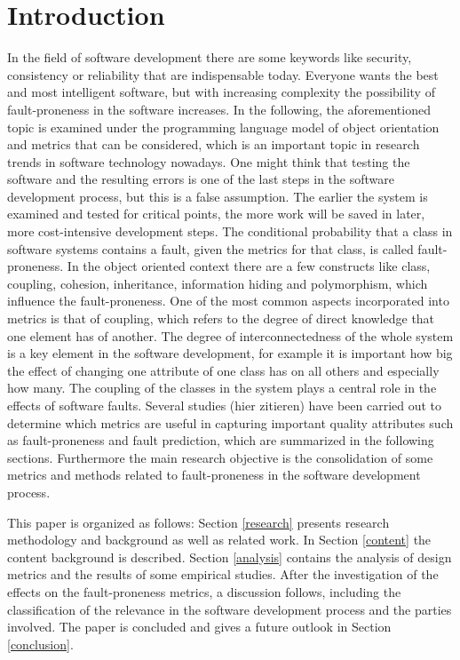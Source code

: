 \section{Introduction}

In the field of software development there are some keywords like security, consistency or reliability that are indispensable today. Everyone wants the best and most intelligent software, but with increasing complexity the possibility of fault-proneness in the software increases. In the following, the aforementioned topic is examined under the programming language model of object orientation and metrics that can be considered, which is an important topic in research trends in software technology nowadays.
One might think that testing the software and the resulting errors is one of the last steps in the software development process, but this is a false assumption. The earlier the system is examined and tested for critical points, the more work will be saved in later, more cost-intensive development steps.
The conditional probability that a class in software systems contains a fault, given the metrics for that class, is called fault-proneness.
In the object oriented context there are a few constructs like class, coupling, cohesion, inheritance, information hiding and polymorphism, which influence the fault-proneness. 
One of the most common aspects incorporated into metrics is that of coupling, which refers to the degree of direct knowledge that one element has of another. The degree of interconnectedness of the whole system is a key element in the software development, for example it is important how big the effect of changing one attribute of one class has on all others and especially how many.
The coupling of the classes in the system plays a central role in the effects of software faults.
Several studies (hier zitieren) have been carried out to determine which metrics are useful in capturing important quality attributes such as fault-proneness  and fault prediction, which are summarized in the following sections.
Furthermore the main research objective is the consolidation of some metrics and methods related to fault-proneness in the software development process.

This paper is organized as follows: Section \ref{research} presents research methodology and background as well as related work. In Section \ref{content} the content background is described. Section \ref{analysis} contains the analysis of design metrics and the results of some empirical studies. After the investigation of the effects on the fault-proneness metrics, a discussion follows, including the classification of the relevance in the software development process and the parties involved. The paper is concluded and gives a future outlook in Section \ref{conclusion}.